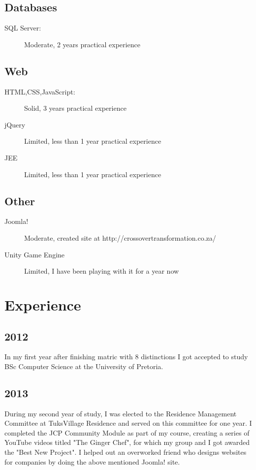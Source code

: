 	\subsection*{Databases}
		\begin{description}
			\item[SQL Server:]Moderate, 2 years practical experience
		\end{description}
	\subsection*{Web}
		\begin{description}
			\item[HTML,CSS,JavaScript:]Solid, 3 years practical experience
			\item[jQuery]Limited, less than 1 year practical experience
			\item[JEE]Limited, less than 1 year practical experience
		\end{description}
	\subsection*{Other}
		\begin{description}
			\item[Joomla!]Moderate, created site at http://crossovertransformation.co.za/
            \item[Unity Game Engine]Limited, I have been playing with it for a year now
		\end{description}

\section*{Experience}

	\subsection*{2012}
		In my first year after finishing matric with 8 distinctions I got accepted to study BSc Computer Science at the University of Pretoria. 
	\subsection*{2013}
		During my second year of study, I was elected to the Residence Management Committee at TuksVillage Residence and served on this committee for one year. I completed the JCP Community Module as part of my course, creating a series of YouTube videos titled "The Ginger Chef", for which my group and I got awarded the "Best New Project". I helped out an overworked friend who designs websites for companies by doing the above mentioned Joomla! site.
